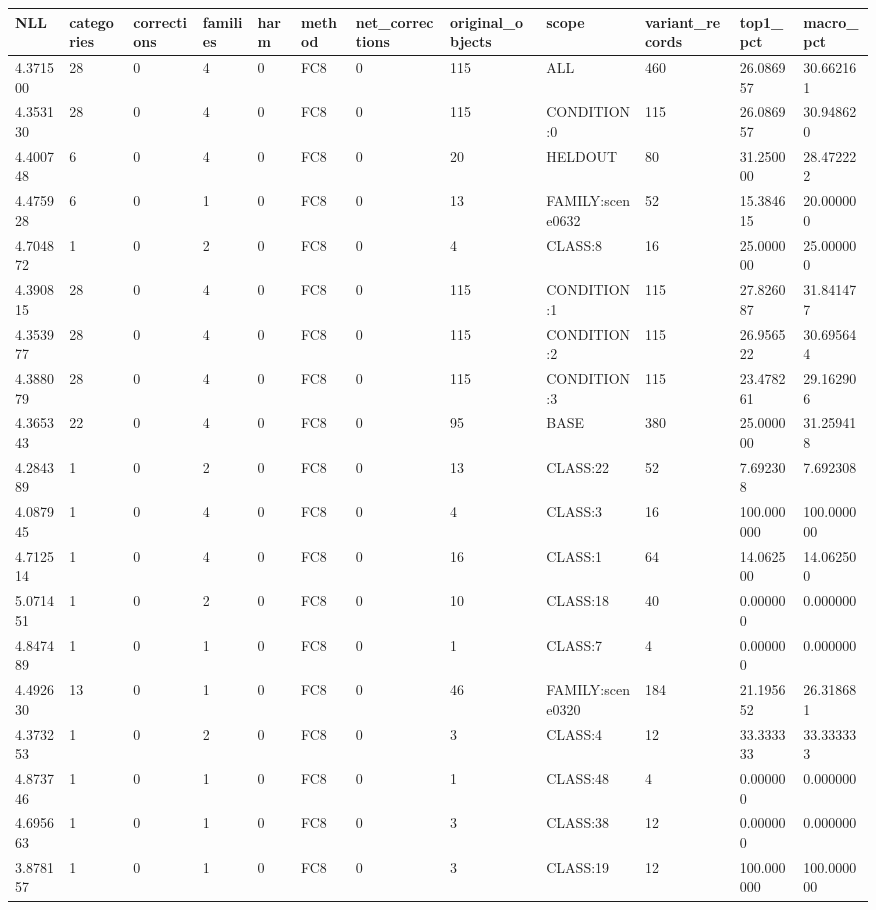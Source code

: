 \begin{tabular}{llllllllllll}
\toprule
NLL & categories & corrections & families & harm & method & net\_corrections & original\_objects & scope & variant\_records & top1\_pct & macro\_pct \\
\midrule
4.371500 & 28 & 0 & 4 & 0 & FC8 & 0 & 115 & ALL & 460 & 26.086957 & 30.662161 \\
4.353130 & 28 & 0 & 4 & 0 & FC8 & 0 & 115 & CONDITION:0 & 115 & 26.086957 & 30.948620 \\
4.400748 & 6 & 0 & 4 & 0 & FC8 & 0 & 20 & HELDOUT & 80 & 31.250000 & 28.472222 \\
4.475928 & 6 & 0 & 1 & 0 & FC8 & 0 & 13 & FAMILY:scene0632 & 52 & 15.384615 & 20.000000 \\
4.704872 & 1 & 0 & 2 & 0 & FC8 & 0 & 4 & CLASS:8 & 16 & 25.000000 & 25.000000 \\
4.390815 & 28 & 0 & 4 & 0 & FC8 & 0 & 115 & CONDITION:1 & 115 & 27.826087 & 31.841477 \\
4.353977 & 28 & 0 & 4 & 0 & FC8 & 0 & 115 & CONDITION:2 & 115 & 26.956522 & 30.695644 \\
4.388079 & 28 & 0 & 4 & 0 & FC8 & 0 & 115 & CONDITION:3 & 115 & 23.478261 & 29.162906 \\
4.365343 & 22 & 0 & 4 & 0 & FC8 & 0 & 95 & BASE & 380 & 25.000000 & 31.259418 \\
4.284389 & 1 & 0 & 2 & 0 & FC8 & 0 & 13 & CLASS:22 & 52 & 7.692308 & 7.692308 \\
4.087945 & 1 & 0 & 4 & 0 & FC8 & 0 & 4 & CLASS:3 & 16 & 100.000000 & 100.000000 \\
4.712514 & 1 & 0 & 4 & 0 & FC8 & 0 & 16 & CLASS:1 & 64 & 14.062500 & 14.062500 \\
5.071451 & 1 & 0 & 2 & 0 & FC8 & 0 & 10 & CLASS:18 & 40 & 0.000000 & 0.000000 \\
4.847489 & 1 & 0 & 1 & 0 & FC8 & 0 & 1 & CLASS:7 & 4 & 0.000000 & 0.000000 \\
4.492630 & 13 & 0 & 1 & 0 & FC8 & 0 & 46 & FAMILY:scene0320 & 184 & 21.195652 & 26.318681 \\
4.373253 & 1 & 0 & 2 & 0 & FC8 & 0 & 3 & CLASS:4 & 12 & 33.333333 & 33.333333 \\
4.873746 & 1 & 0 & 1 & 0 & FC8 & 0 & 1 & CLASS:48 & 4 & 0.000000 & 0.000000 \\
4.695663 & 1 & 0 & 1 & 0 & FC8 & 0 & 3 & CLASS:38 & 12 & 0.000000 & 0.000000 \\
3.878157 & 1 & 0 & 1 & 0 & FC8 & 0 & 3 & CLASS:19 & 12 & 100.000000 & 100.000000 \\

\end{tabular}
